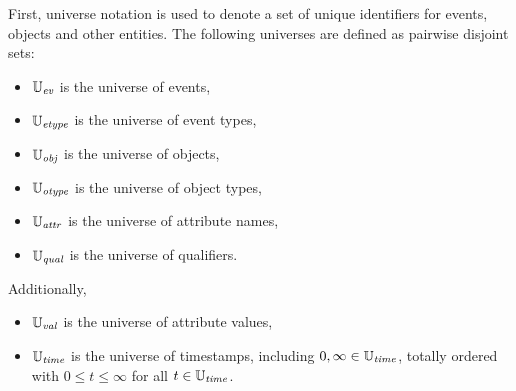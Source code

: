 First, universe notation is used to denote a set of unique identifiers for events, objects and other entities.
The following universes are defined as pairwise disjoint sets:
\begin{itemize}
  \item $\mathbb{U}_{\mathit{ev}}$ is the universe of events,
  \item $\mathbb{U}_{\mathit{etype}}$ is the universe of event types,
  \item $\mathbb{U}_{\mathit{obj}}$ is the universe of objects,
  \item $\mathbb{U}_{\mathit{otype}}$ is the universe of object types,
  \item $\mathbb{U}_{\mathit{attr}}$ is the universe of attribute names,
  \item $\mathbb{U}_{\mathit{qual}}$ is the universe of qualifiers.
\end{itemize}
Additionally,
\begin{itemize}
  \item $\mathbb{U}_{\mathit{val}}$ is the universe of attribute values,
  \item $\mathbb{U}_{\mathit{time}}$ is the universe of timestamps, including $0,\infty\in\mathbb{U}_{\mathit{time}}$, totally ordered with $0\leq t \leq \infty$ for all $t\in\mathbb{U}_{\mathit{time}}$.
\end{itemize}

